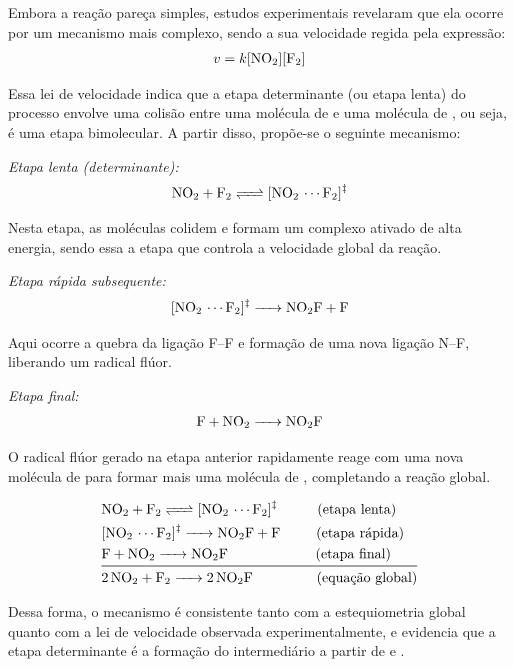 Embora a reação pareça simples, estudos experimentais revelaram que ela ocorre por um mecanismo mais complexo, sendo a sua velocidade regida pela expressão:
\begin{align*}
v = k[\ce{NO2}][\ce{F2}]
\end{align*}

Essa lei de velocidade indica que a etapa determinante (ou etapa lenta) do processo envolve uma colisão entre uma molécula de  e uma molécula de , ou seja, é uma etapa bimolecular. A partir disso, propõe-se o seguinte mecanismo:

\textit{Etapa lenta (determinante):}
\begin{align*}
\ce{NO2 + F2 <=> [NO2 \cdots F2]^{\ddagger}}
\end{align*}

Nesta etapa, as moléculas colidem e formam um complexo ativado de alta energia, sendo essa a etapa que controla a velocidade global da reação.

\textit{Etapa rápida subsequente:}
\begin{align*}
\ce{[NO2 \cdots F2]^{\ddagger} -> NO2F + F}
\end{align*}

Aqui ocorre a quebra da ligação F–F e formação de uma nova ligação N–F, liberando um radical flúor.

\textit{Etapa final:}
\begin{align*}
\ce{F + NO2 -> NO2F}
\end{align*}

O radical flúor gerado na etapa anterior rapidamente reage com uma nova molécula de  para formar mais uma molécula de , completando a reação global.

\begin{align*}
&\ce{NO2 + F2 <=> [NO2 \cdots F2]^{\ddagger}} \hspace{1.0cm} \text{(etapa lenta)}\\
&\ce{[NO2 \cdots F2]^{\ddagger} -> NO2F + F} \hspace{0.9cm} \text{(etapa rápida)}\\
&\ce{F + NO2 -> NO2F} \hspace{2.2cm} \text{(etapa final)}\\
\midrule %
&\ce{2NO2 + F2 -> 2NO2F} \hspace{1.6cm} \text{(equação global)}
\end{align*}

Dessa forma, o mecanismo é consistente tanto com a estequiometria global quanto com a lei de velocidade observada experimentalmente, e evidencia que a etapa determinante é a formação do intermediário a partir de  e .

